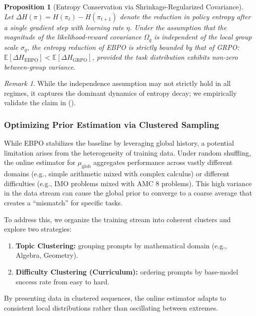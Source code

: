 \documentclass{article}
\theoremstyle{plain}
\newtheorem{proposition}[theorem]{Proposition}
\theoremstyle{definition}
\theoremstyle{remark}
\newtheorem{remark}[theorem]{Remark}
\begin{document}
\begin{proposition}[Entropy Conservation via Shrinkage-Regularized Covariance]
\label{prop:entropy_conservation}
Let $\Delta H(\pi)=H(\pi_t)-H(\pi_{t+1})$ denote the reduction in policy entropy after a single gradient step with learning rate $\eta$. Under the assumption that the magnitude of the likelihood-reward covariance $\Omega_q$ is independent of the local group scale $\sigma_q$, the entropy reduction of EBPO is strictly bounded by that of GRPO:
$\mathbb{E}[\Delta H_{\text{EBPO}}] < \mathbb{E}[\Delta H_{\text{GRPO}}]$,
provided the task distribution exhibits non-zero between-group variance.
\end{proposition}
\begin{remark}
While the independence assumption may not strictly hold in all regimes, it captures the dominant dynamics of entropy decay; we empirically validate the claim in  ().
\end{remark}

\subsubsection{Optimizing Prior Estimation via Clustered Sampling}
\label{sec:clustering}

While EBPO stabilizes the baseline by leveraging global history, a potential limitation arises from the heterogeneity of training data. Under random shuffling, the online estimator for $\mu_{\text{glob}}$ aggregates performance across vastly different domains (e.g., simple arithmetic mixed with complex calculus) or different difficulties (e.g., IMO problems mixed with AMC 8 problems). This high variance in the data stream can cause the global prior to converge to a coarse average that creates a ``mismatch'' for specific tasks.

To address this, we organize the training stream into coherent clusters and explore two strategies:
\begin{enumerate}
    \item \textbf{Topic Clustering:} grouping prompts by mathematical domain (e.g., Algebra, Geometry).
    \item \textbf{Difficulty Clustering (Curriculum):} ordering prompts by base-model success rate from easy to hard.
\end{enumerate}
By presenting data in clustered sequences, the online estimator adapts to consistent local distributions rather than oscillating between extremes.
\end{document}
